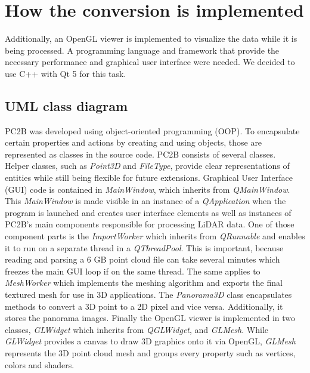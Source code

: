 \section{How the conversion is implemented}

Additionally, an OpenGL viewer is implemented to visualize the data while it is being processed. A programming language and framework that provide the necessary performance and graphical user interface were needed. We decided to use C++ with Qt 5 for this task.



\subsection{UML class diagram}

PC2B was developed using object-oriented programming (OOP). To encapsulate certain properties and actions by creating and using objects, those are represented as classes in the source code. PC2B consists of several classes.\\

Helper classes, such as \textit{Point3D} and \textit{FileType}, provide clear representations of entities while still being flexible for future extensions. Graphical User Interface (GUI) code is contained in \textit{MainWindow}, which inherits from \textit{QMainWindow}. This \textit{MainWindow} is made visible in an instance of a \textit{QApplication} when the program is launched and creates user interface elements as well as instances of PC2B's main components responsible for processing LiDAR data. One of those component parts is the \textit{ImportWorker} which inherits from \textit{QRunnable} and enables it to run on a separate thread in a \textit{QThreadPool}. This is important, because reading and parsing a 6 GB point cloud file can take several minutes which freezes the main GUI loop if on the same thread. The same applies to \textit{MeshWorker} which implements the meshing algorithm and exports the final textured mesh for use in 3D applications. The \textit{Panorama3D} class encapsulates methods to convert a 3D point to a 2D pixel and vice versa. Additionally, it stores the panorama images. Finally the OpenGL viewer is implemented in two classes, \textit{GLWidget} which inherits from \textit{QGLWidget}, and \textit{GLMesh}. While \textit{GLWidget} provides a canvas to draw 3D graphics onto it via OpenGL, \textit{GLMesh} represents the 3D point cloud mesh and groups every property such as vertices, colors and shaders.\\

